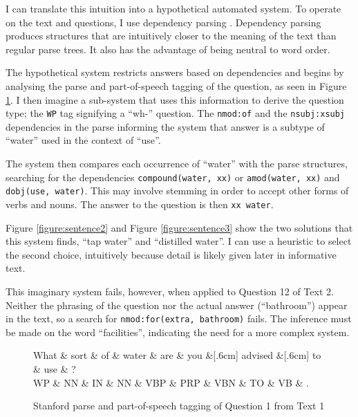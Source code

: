 \documentclass[12pt]{article}
\begin{document}
I can translate this intuition into a hypothetical automated system. To operate on the text and questions, I use dependency parsing \citep{lecture5}. Dependency parsing produces structures that are intuitively closer to the meaning of the text than regular parse trees. It also has the advantage of being neutral to word order.

The hypothetical system restricts answers based on dependencies and begins by analysing the parse and part-of-speech tagging of the question, as seen in Figure \ref{figure:question1}. I then imagine a sub-system that uses this information to derive the question type; the \texttt{WP} tag signifying a ``wh-'' question. The \texttt{nmod:of} and the \texttt{nsubj:xsubj} dependencies in the parse informing the system that answer is a subtype of ``water'' used in the context of ``use''.

The system then compares each occurrence of ``water'' with the parse structures, searching for the dependencies \texttt{compound(water, xx)} or \texttt{amod(water, xx)} and \texttt{dobj(use, water)}. This may involve stemming \citep{lecture2} in order to accept other forms of verbs and nouns. The answer to the question is then \texttt{xx water}.

Figure \ref{figure:sentence2} and Figure \ref{figure:sentence3} show the two solutions that this system finds, ``tap water'' and ``distilled water''. I can use a heuristic to select the second choice, intuitively because detail is likely given later in informative text.

This imaginary system fails, however, when applied to Question 12 of Text 2. Neither the phrasing of the question nor the actual answer (``bathroom'') appear in the text, so a search for \texttt{nmod:for(extra, bathroom)} fails. The inference must be made on the word ``facilities'', indicating the need for a more complex system.

\begin{figure}[H]
\begin{dependency}
   \begin{deptext}[column sep=0.9cm, row sep=.5ex]
      What \& sort \& of \& water \& are \& you \&[.6cm] advised \&[.6cm] to \& use \& ? \\
      WP \& NN \& IN \& NN \& VBP \& PRP \& VBN \& TO \& VB \& .\\
   \end{deptext}
\end{dependency}
\caption{Stanford parse and part-of-speech tagging of Question 1 from Text 1}
\label{figure:question1}
\end{figure}
\end{document}
